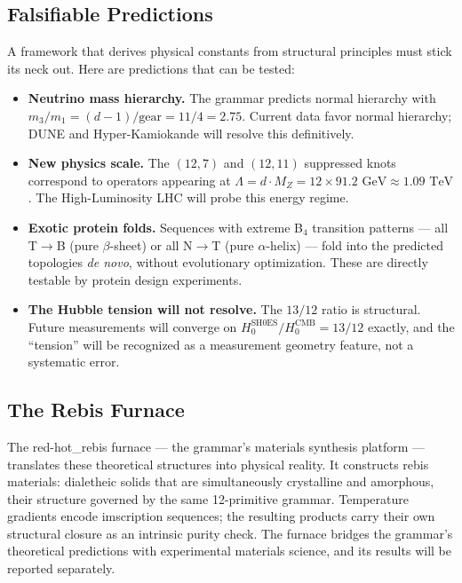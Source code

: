 \documentclass[11pt,a4paper,twocolumn]{article}
\begin{document}
\subsection{Falsifiable Predictions}

A framework that derives physical constants from structural principles must stick its neck out. Here are predictions that can be tested:

\begin{itemize}
\item[\raisebox{0pt}{☞}] \textbf{Neutrino mass hierarchy.} The grammar predicts normal hierarchy with $m_3/m_1 = (d-1)/\text{gear} = 11/4 = 2.75$. Current data favor normal hierarchy; DUNE and Hyper-Kamiokande will resolve this definitively.

\item[\raisebox{0pt}{☞}] \textbf{New physics scale.} The $(12,7)$ and $(12,11)$ suppressed knots correspond to operators appearing at $\Lambda = d \cdot M_Z = 12 \times 91.2 \text{ GeV} \approx 1.09 \text{ TeV}$. The High-Luminosity LHC will probe this energy regime.

\item[\raisebox{0pt}{☞}] \textbf{Exotic protein folds.} Sequences with extreme B$_4$ transition patterns — all T$\to$B (pure $\beta$-sheet) or all N$\to$T (pure $\alpha$-helix) — fold into the predicted topologies \emph{de novo}, without evolutionary optimization. These are directly testable by protein design experiments.

\item[\raisebox{0pt}{☞}] \textbf{The Hubble tension will not resolve.} The $13/12$ ratio is structural. Future measurements will converge on $H_0^{\text{SH0ES}}/H_0^{\text{CMB}} = 13/12$ exactly, and the ``tension'' will be recognized as a measurement geometry feature, not a systematic error.
\end{itemize}

\subsection{The Rebis Furnace}

The red-hot\_rebis furnace — the grammar's materials synthesis platform — translates these theoretical structures into physical reality. It constructs rebis materials: dialetheic solids that are simultaneously crystalline and amorphous, their structure governed by the same 12-primitive grammar. Temperature gradients encode imscription sequences; the resulting products carry their own structural closure as an intrinsic purity check. The furnace bridges the grammar's theoretical predictions with experimental materials science, and its results will be reported separately.
\end{document}
